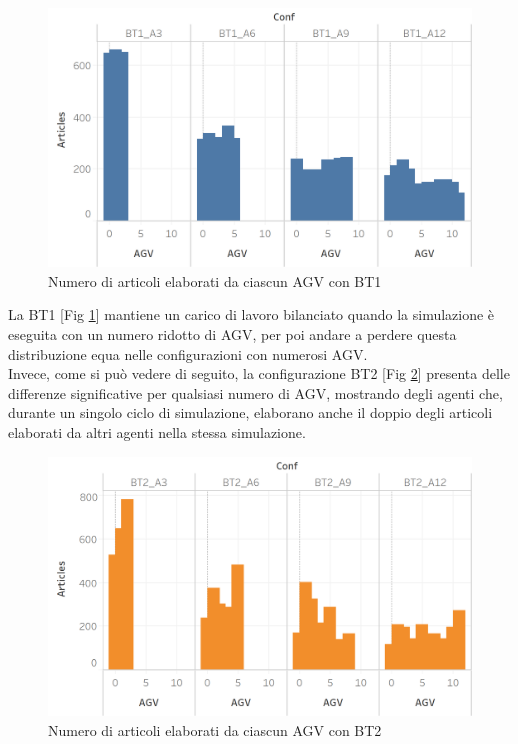 \documentclass[12pt]{article}
\begin{document}
\begin{figure}[H]
\centering
  \includegraphics[width=0.8\linewidth]{Figures/Results_Graphics/Articles_BT1.png}
  \caption{Numero di articoli elaborati da ciascun AGV con BT1}\label{fig:articles_agv_bt1}
\end{figure}

\noindent La BT1 [Fig \ref{fig:articles_agv_bt1}] mantiene un carico di lavoro bilanciato quando la simulazione è eseguita con un numero ridotto di AGV, per poi andare a perdere questa distribuzione equa nelle configurazioni con numerosi AGV.\\
\noindent Invece, come si può vedere di seguito, la configurazione BT2 [Fig \ref{fig:articles_agv_bt2}] presenta delle differenze significative per qualsiasi numero di AGV, mostrando degli agenti che, durante un singolo ciclo di simulazione, elaborano anche il doppio degli articoli elaborati da altri agenti nella stessa simulazione.

\begin{figure}[H]
\centering
  \includegraphics[width=0.8\linewidth]{Figures/Results_Graphics/Articles_BT2.png}
  \caption{Numero di articoli elaborati da ciascun AGV con BT2}\label{fig:articles_agv_bt2}
\end{figure}
\end{document}
